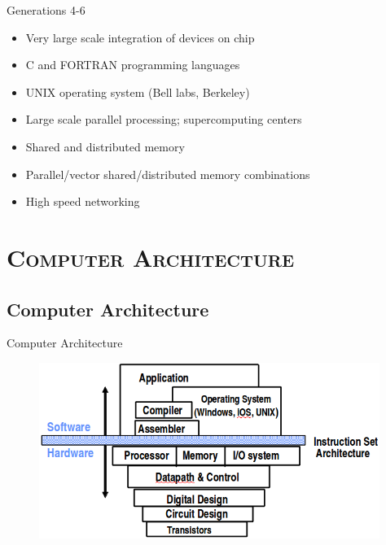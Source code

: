 \documentclass[xcolor=x11names,compress]{beamer}
\renewcommand{\(}{\begin{columns}}
\renewcommand{\)}{\end{columns}}
\newcommand{\<}[1]{\begin{column}{#1}}
\renewcommand{\>}{\end{column}}
\begin{document}
\begin{frame}{Generations 4-6}
\begin{itemize}
\item Very large scale integration of devices on chip \vspace*{0.5 em}
\item C and FORTRAN programming languages\vspace*{0.5 em}
\item \alert{UNIX} operating system (Bell labs, Berkeley)\vspace*{0.5 em}
\item Large scale parallel processing; supercomputing centers\vspace*{0.5 em}
\item Shared and distributed memory\vspace*{0.5 em}
\item Parallel/vector shared/distributed memory combinations\vspace*{0.5 em}
\item High speed networking
\end{itemize}
\end{frame}

\section{\scshape Computer Architecture}
\subsection{Computer Architecture}
\begin{frame}{Computer Architecture}
 \begin{figure}
   \begin{center}
     \includegraphics[height=2.25in,clip]{ComputerArchitecture}
   \end{center}
 \end{figure}
\end{frame}
\end{document}

